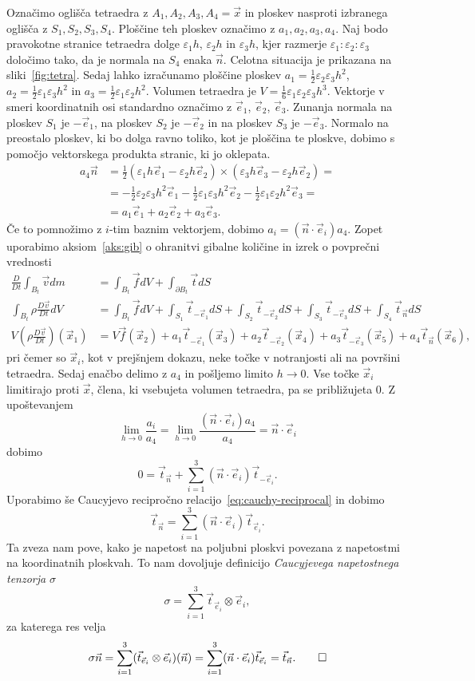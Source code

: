 \documentclass[a4paper,twoside]{article}
\theoremstyle{definition} %
\theoremstyle{plain} %
\numberwithin{equation}{section}
\newcommand{\eps}{\varepsilon}
\newcommand{\DD}[2]{\ensuremath{\frac{D #1}{D #2}}}
\newcommand{\DDt}[1]{\DD{#1}{t}}
\newcommand{\vv}{\vec{v}}
\newcommand{\vt}{\vec{t}}
\newcommand{\vn}{\vec{n}}
\newcommand{\vf}{\vec{f}}
\newcommand{\vx}{\vec{x}}
\newcommand{\ei}{\vec{e}_1}
\newcommand{\ej}{\vec{e}_2}
\newcommand{\ek}{\vec{e}_3}
\newcommand{\ts}{\sigma}
\begin{document}
Označimo oglišča tetraedra z $A_1, A_2, A_3, A_4 = \vx$ in ploskev nasproti izbranega
oglišča z $S_1, S_2, S_3, S_4$. Ploščine teh ploskev označimo z
$a_1, a_2, a_3, a_4$.  Naj bodo pravokotne stranice tetraedra
dolge $\eps_1 h$, $\eps_2 h$ in $\eps_3 h$, kjer razmerje $\eps_1 : \eps_2 : \eps_3$
določimo tako, da je normala na $S_4$ enaka $\vn$.
Celotna situacija je prikazana na sliki~\ref{fig:tetra}.
Sedaj lahko izračunamo ploščine ploskev $a_1 = \frac12 \eps_2\eps_3h^2$,
$a_2 = \frac12 \eps_1\eps_3h^2$ in $a_3 = \frac12 \eps_1\eps_2h^2$.
Volumen tetraedra je $V = \frac16 \eps_1\eps_2\eps_3h^3$.
Vektorje v smeri koordinatnih osi standardno označimo z $\ei$, $\ej$, $\ek$.
Zunanja normala na ploskev $S_1$ je $-\ei$, na ploskev $S_2$ je $-\ej$ in na
ploskev $S_3$ je $-\ek$. Normalo na preostalo ploskev, ki bo dolga ravno toliko,
kot je ploščina te ploskve, dobimo s pomočjo vektorskega produkta
stranic, ki jo oklepata.
\begin{align*}
  a_4\vn &= \frac12 (\eps_1h \ei - \eps_2h \ej) \times (\eps_3h \ek - \eps_2h
  \ej) = \\ &=
  -\frac12 \eps_2\eps_3 h^2\ei
  -\frac12 \eps_1\eps_3 h^2\ej
  -\frac12 \eps_1\eps_2 h^2\ek = \\
  &= a_1 \ei + a_2 \ej + a_3 \ek.
\end{align*}
Če to pomnožimo z $i$-tim baznim vektorjem, dobimo $a_i = (\vn\cdot\vec{e}_i)
a_4$.
Zopet uporabimo aksiom~\ref{aks:gib} o ohranitvi gibalne količine in izrek o
povprečni vrednosti
\begin{align*}
  \DDt{} \int_{B_t} \vv dm &= \int_{B_t} \vf dV + \int_{\partial {B_t}} \vt dS \\
\int_{B_t} \rho\DDt{\vv} dV &= \int_{B_t} \vf dV +
  \int_{S_1} \vt_{-\ei} dS +
  \int_{S_2} \vt_{-\ej} dS +
  \int_{S_3} \vt_{-\ek} dS +
  \int_{S_4} \vt_{\vn} dS
  \\
  V (\rho\DDt{\vv})(\vx_1) &= V \vf(\vx_2) +
  a_1 \vt_{-\ei}(\vx_3) + a_2 \vt_{-\ej}(\vx_4) + a_3 \vt_{-\ek}(\vx_5) + a_4
  \vt_{\vn}(\vx_6),
\end{align*}
pri čemer so $\vx_i$, kot v prejšnjem dokazu, neke točke v notranjosti ali na
površini tetraedra. Sedaj enačbo delimo z $a_4$ in pošljemo limito $h \to 0$.
Vse točke $\vx_i$ limitirajo proti $\vx$, člena, ki vsebujeta volumen tetraedra,
pa se približujeta 0. Z upoštevanjem
\[
  \lim_{h\to0} \frac{a_i}{a_4} = \lim_{h\to0}\frac{(\vn\cdot\vec{e}_i) a_4}{a_4}
  = \vn\cdot\vec{e}_i
\]
dobimo
\[
  0 = \vt_{\vn} + \sum_{i=1}^3 (\vn \cdot\vec{e}_i) \vt_{-\vec{e}_i}.
\]
Uporabimo še Caucyjevo recipročno relacijo~\eqref{eq:cauchy-reciprocal} in dobimo
\[
  \vt_{\vn} = \sum_{i=1}^3 (\vn \cdot\vec{e}_i) \vt_{\vec{e}_i}.
\]
Ta zveza nam pove, kako je napetost na poljubni ploskvi povezana z napetostmi na
koordinatnih ploskvah.
To nam dovoljuje definicijo \emph{Caucyjevega napetostnega tenzorja}
$\ts$
\[
  \ts = \sum_{i=1}^3 \vt_{\vec{e}_i}\otimes \vec{e}_i,
\]
za katerega res velja
\[
  \ts\vn = \sum_{i=1}^3 (\vt_{\vec{e}_i}\otimes \vec{e}_i)(\vn) =
  \sum_{i=1}^3 (\vn \cdot\vec{e}_i) \vt_{\vec{e}_i} = \vt_{\vn}. \qedhere
\]
\endproof
\end{document}
